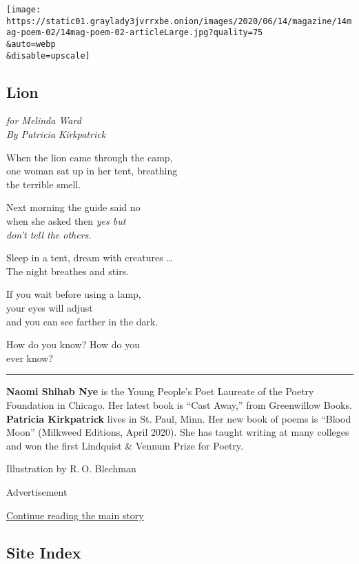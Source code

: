 \texttt{[image: https://static01.graylady3jvrrxbe.onion/images/2020/06/14/magazine/14mag-poem-02/14mag-poem-02-articleLarge.jpg?quality=75\\\&auto=webp\\\&disable=upscale]}

\hypertarget{lion}{%
\subsection{Lion}\label{lion}}

\emph{for Melinda Ward}\\
\emph{By Patricia Kirkpatrick}

When the lion came through the camp,\\
one woman sat up in her tent, breathing\\
the terrible smell.

Next morning the guide said no\\
when she asked then \emph{yes but}\\
\emph{don't tell the others.}

Sleep in a tent, dream with creatures \ldots{}\\
The night breathes and stirs.

If you wait before using a lamp,\\
your eyes will adjust\\
and you can see farther in the dark.

How do you know? How do you\\
ever know?

\begin{center}\rule{0.5\linewidth}{\linethickness}\end{center}

\textbf{Naomi Shihab Nye} is the Young People's Poet Laureate of the
Poetry Foundation in Chicago. Her latest book is ``Cast Away,'' from
Greenwillow Books. \textbf{Patricia Kirkpatrick} lives in St. Paul,
Minn. Her new book of poems is ``Blood Moon'' (Milkweed Editions, April
2020). She has taught writing at many colleges and won the first
Lindquist \& Vennum Prize for Poetry.

Illustration by R. O. Blechman

Advertisement

\protect\hyperlink{after-bottom}{Continue reading the main story}

\hypertarget{site-index}{%
\subsection{Site Index}\label{site-index}}

